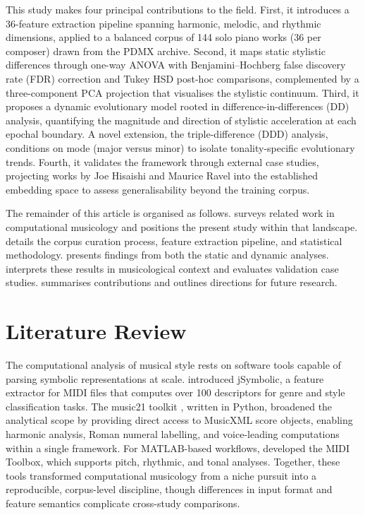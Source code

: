 \documentclass[]{interact}
\theoremstyle{plain}
\theoremstyle{definition}
\theoremstyle{remark}
\begin{document}
This study makes four principal contributions to the field. First, it introduces a
36-feature extraction pipeline spanning harmonic, melodic, and rhythmic dimensions,
applied to a balanced corpus of 144 solo piano works (36 per composer) drawn from the
PDMX archive. Second, it maps static stylistic differences through one-way ANOVA with
Benjamini--Hochberg false discovery rate (FDR) correction \citep{Benjamini1995} and
Tukey HSD post-hoc comparisons, complemented by a three-component PCA projection that
visualises the stylistic continuum. Third, it proposes a dynamic evolutionary model
rooted in difference-in-differences (DD) analysis, quantifying the magnitude and
direction of stylistic acceleration at each epochal boundary. A novel extension, the
triple-difference (DDD) analysis, conditions on mode (major versus minor) to isolate
tonality-specific evolutionary trends. Fourth, it validates the framework through
external case studies, projecting works by Joe Hisaishi and Maurice Ravel into the
established embedding space to assess generalisability beyond the training corpus.

The remainder of this article is organised as follows.  surveys
related work in computational musicology and positions the present study within that
landscape.  details the corpus curation process, feature extraction
pipeline, and statistical methodology.  presents findings from both
the static and dynamic analyses.  interprets these results in
musicological context and evaluates validation case studies. 
summarises contributions and outlines directions for future research.

\section{Literature Review}\label{sec:litreview}

The computational analysis of musical style rests on software tools capable of
parsing symbolic representations at scale. \citet{McKay2006} introduced jSymbolic,
a feature extractor for MIDI files that computes over 100 descriptors for genre
and style classification tasks. The music21 toolkit \citep{Cuthbert2010}, written
in Python, broadened the analytical scope by providing direct access to MusicXML
score objects, enabling harmonic analysis, Roman numeral labelling, and voice-leading
computations within a single framework. For MATLAB-based workflows,
\citet{EerolaToiviainen2004} developed the MIDI Toolbox, which supports pitch,
rhythmic, and tonal analyses. Together, these tools transformed computational
musicology from a niche pursuit into a reproducible, corpus-level discipline, though
differences in input format and feature semantics complicate cross-study comparisons.
\end{document}
